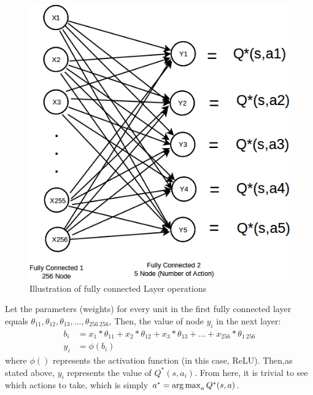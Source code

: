 \begin{enumerate}
\begin{figure}[H]
            \includegraphics[scale=0.5]{images/FCLayer.png}
            \caption{Illustration of fully connected Layer operations}
            \label{fig:fclayer}
        \end{figure}
        Let the parameters (weights) for every unit in the first fully connected layer equals $\theta_{1 1},\theta_{1 2},\theta_{1 3}, ... , \theta_{256 \ 256} $, Then, the value of node $y_i$ in the next layer:
        \begin{align*}
            b_i&=x_1*\theta_{11}+x_2*\theta_{12}+x_3*\theta_{13}+...+x_{256}*\theta_{1 \ 256} \\
            y_i&=\phi(b_i)
        \end{align*}
        where $\phi()$ represents the activation function (in this case, ReLU). Then,as stated above, $y_i$ represents the value of $Q^*(s,a_i)$. From here, it is trivial to see which actions to take, which is simply $a^*=\operatorname*{arg\,max}_a Q^*(s,a)$. 
        \end{enumerate}
        

